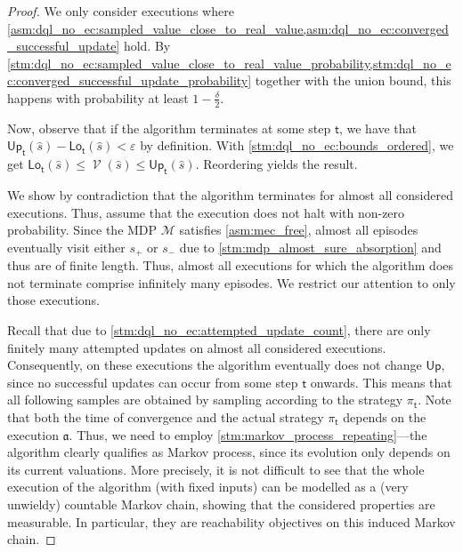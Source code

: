 \documentclass{article}
\newcommand{\MDP}{\mathcal{M}}
\newcommand{\initialstate}{\hat{s}}
\newcommand{\strategy}{\pi}
\DeclareMathOperator{\val}{\mathcal{V}}
\newcommand{\upperbound}{\mathsf{Up}}
\newcommand{\lowerbound}{\mathsf{Lo}}
\newcommand{\targetstate}{s_+}
\newcommand{\sinkstate}{s_-}
\newcommand{\algostep}{\mathsf{t}}
\newcommand{\algorithmexecution}{\mathfrak{a}}
\begin{document}
\begin{proof}
	We only consider executions where \cref{asm:dql_no_ec:sampled_value_close_to_real_value,asm:dql_no_ec:converged_successful_update} hold.
	By \cref{stm:dql_no_ec:sampled_value_close_to_real_value_probability,stm:dql_no_ec:converged_successful_update_probability} together with the union bound, this happens with probability at least $1 - \frac{\delta}{2}$.

	Now, observe that if the algorithm terminates at some step $\algostep$, we have that $\upperbound_\algostep(\initialstate) - \lowerbound_\algostep(\initialstate) < \varepsilon$ by definition.
	With \cref{stm:dql_no_ec:bounds_ordered}, we get $\lowerbound_\algostep(\initialstate) \leq \val(\initialstate) \leq \upperbound_\algostep(\initialstate)$.
    Reordering yields the result.

	We show by contradiction that the algorithm terminates for almost all considered executions.
	Thus, assume that the execution does not halt with non-zero probability.
	Since the MDP $\MDP$ satisfies \cref{asm:mec_free}, almost all episodes eventually visit either $\targetstate$ or $\sinkstate$ due to \cref{stm:mdp_almost_sure_absorption} and thus are of finite length.
	Thus, almost all executions for which the algorithm does not terminate comprise infinitely many episodes.
	We restrict our attention to only those executions.

	Recall that due to \cref{stm:dql_no_ec:attempted_update_count}, there are only finitely many attempted updates on almost all considered executions.
	Consequently, on these executions the algorithm eventually does not change $\upperbound$, since no successful updates can occur from some step $\algostep$ onwards.
	This means that all following samples are obtained by sampling according to the strategy $\strategy_\algostep$.
	Note that both the time of convergence and the actual strategy $\strategy_\algostep$ depends on the execution $\algorithmexecution$.
	Thus, we need to employ \cref{stm:markov_process_repeating}---the algorithm clearly qualifies as Markov process, since its evolution only depends on its current valuations.
	More precisely, it is not difficult to see that the whole execution of the algorithm (with fixed inputs) can be modelled as a (very unwieldy) countable Markov chain, showing that the considered properties are measurable.
	In particular, they are reachability objectives on this induced Markov chain.


\end{proof}
\end{document}
